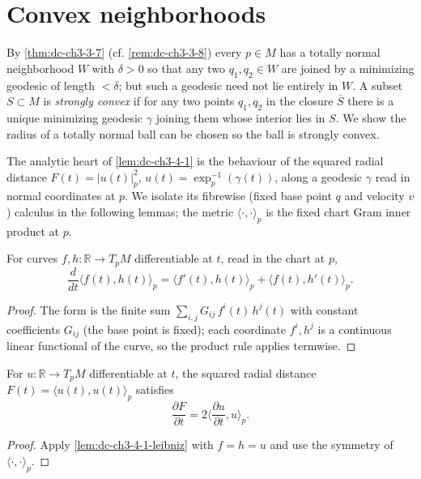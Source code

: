 \section{Convex neighborhoods}

By \cref{thm:dc-ch3-3-7} (cf. \cref{rem:dc-ch3-3-8}) every $p\in M$ has a totally normal neighborhood
$W$ with $\delta>0$ so that any two $q_1,q_2\in W$ are joined by a minimizing
geodesic of length $<\delta$; but such a geodesic need not lie entirely in $W$. A
subset $S\subset M$ is \emph{strongly convex} if for any two points $q_1,q_2$ in the
closure $\overline{S}$ there is a unique minimizing geodesic $\gamma$ joining them
whose interior lies in $S$. We show the radius of a totally normal ball can be
chosen so the ball is strongly convex.

The analytic heart of \cref{lem:dc-ch3-4-1} is the behaviour of the squared radial
distance $F(t)=|u(t)|_p^2$, $u(t)=\exp_p^{-1}(\gamma(t))$, along a geodesic $\gamma$
read in normal coordinates at $p$. We isolate its fibrewise (fixed base point $q$
and velocity $v$) calculus in the following lemmas; the metric
$\langle\cdot,\cdot\rangle_p$ is the fixed chart Gram inner product at $p$.

\begin{lemma}
  \label{lem:dc-ch3-4-1-leibniz}


  For curves $f,h:\mathbb{R}\to T_pM$ differentiable at $t$, read in the chart at
  $p$,
  $$\frac{d}{dt}\langle f(t),h(t)\rangle_p
    = \langle f'(t),h(t)\rangle_p + \langle f(t),h'(t)\rangle_p.$$
\end{lemma}
\begin{proof}
  \sketch

  The form is the finite sum $\sum_{i,j}G_{ij}\,f^i(t)\,h^j(t)$ with constant
  coefficients $G_{ij}$ (the base point is fixed); each coordinate $f^i,h^j$ is a
  continuous linear functional of the curve, so the product rule applies termwise.
\end{proof}

\begin{lemma}
  \label{lem:dc-ch3-4-1-dF}


  For $u:\mathbb{R}\to T_pM$ differentiable at $t$, the squared radial distance
  $F(t)=\langle u(t),u(t)\rangle_p$ satisfies
  $$\frac{\partial F}{\partial t}=2\Big\langle\frac{\partial u}{\partial t},u\Big\rangle_p.$$
\end{lemma}
\begin{proof}
  \sketch

  Apply \cref{lem:dc-ch3-4-1-leibniz} with $f=h=u$ and use the symmetry of
  $\langle\cdot,\cdot\rangle_p$.
\end{proof}

